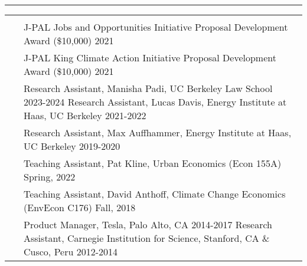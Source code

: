 \documentclass[letterpaper,10pt,oneside]{article}
\newenvironment{myresume}[2]{\pdfbookmark{#1}{#1}{\LARGE{\textbf{#1}}}\vspace{1mm}\hrule\vspace{-2mm}\begin{longtable}{p{0.12\textwidth} p{0.8\textwidth}}&#2}{\end{longtable}}
\renewcommand{\section}[2]{\vspace{-1.5em}\\\pdfbookmark{#1}{#2}{\singlespace\textsc{#1}}&}
\newcommand{\firstentry}[1]{\vspace{0em}\newline#1\vspace{0em}}
\newcommand{\entry}[1]{\vspace{-1em}\\~&#1}
\begin{document}
\begin{myresume}{}
\entry{J-PAL Jobs and Opportunities Initiative Proposal Development Award (\$10,000) \hfill 2021
}

\entry{J-PAL King Climate Action Initiative Proposal Development Award (\$10,000) \hfill 2021
}


\section{Research \newline Positions}{positions}

\firstentry{Research Assistant, Manisha Padi, UC Berkeley Law School \hspace{4.9cm} 2023-2024
\newline Research Assistant, Lucas Davis, Energy Institute at Haas, UC Berkeley \hfill 2021-2022
}



\entry{Research Assistant, Max Auffhammer, Energy Institute at Haas, UC Berkeley \hfill 2019-2020
}



\section{Teaching}{teaching}

\firstentry{Teaching Assistant, Pat Kline, Urban Economics (Econ 155A) \hfill Spring, 2022
}

\entry{Teaching Assistant, David Anthoff, Climate Change Economics (EnvEcon C176) \hfill Fall, 2018
}


\section{Prior \newline Employment}{prior}

\firstentry{Product Manager, Tesla, Palo Alto, CA \hspace{7.95cm} 2014-2017
\newline Research Assistant, Carnegie Institution for Science, Stanford, CA \& Cusco, Peru \hfill 2012-2014
}


\end{myresume}
\end{document}
